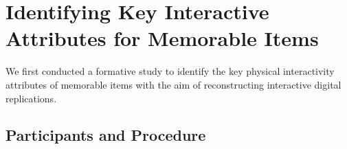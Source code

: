 \section{Identifying Key Interactive Attributes for Memorable Items}
We first conducted a formative study to identify the key physical interactivity attributes of memorable items with the aim of reconstructing interactive digital replications.



\subsection{Participants and Procedure}





